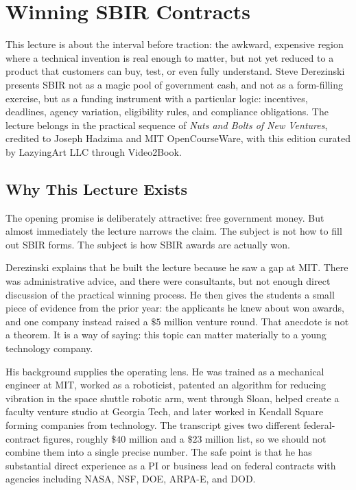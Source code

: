 \chapter{Winning SBIR Contracts}

This lecture is about the interval before traction: the awkward, expensive region where a technical invention is real enough to matter, but not yet reduced to a product that customers can buy, test, or even fully understand. Steve Derezinski presents SBIR not as a magic pool of government cash, and not as a form-filling exercise, but as a funding instrument with a particular logic: incentives, deadlines, agency variation, eligibility rules, and compliance obligations. The lecture belongs in the practical sequence of \emph{Nuts and Bolts of New Ventures}, credited to Joseph Hadzima and MIT OpenCourseWare, with this edition curated by LazyingArt LLC through Video2Book.

\section{Why This Lecture Exists}

The opening promise is deliberately attractive: free government money. But almost immediately the lecture narrows the claim. The subject is not how to fill out SBIR forms. The subject is how SBIR awards are actually won.

Derezinski explains that he built the lecture because he saw a gap at MIT. There was administrative advice, and there were consultants, but not enough direct discussion of the practical winning process. He then gives the students a small piece of evidence from the prior year: the applicants he knew about won awards, and one company instead raised a \(\$5\) million venture round. That anecdote is not a theorem. It is a way of saying: this topic can matter materially to a young technology company.

His background supplies the operating lens. He was trained as a mechanical engineer at MIT, worked as a roboticist, patented an algorithm for reducing vibration in the space shuttle robotic arm, went through Sloan, helped create a faculty venture studio at Georgia Tech, and later worked in Kendall Square forming companies from technology. The transcript gives two different federal-contract figures, roughly \(\$40\) million and a \(\$23\) million list, so we should not combine them into a single precise number. The safe point is that he has substantial direct experience as a PI or business lead on federal contracts with agencies including NASA, NSF, DOE, ARPA-E, and DOD.

